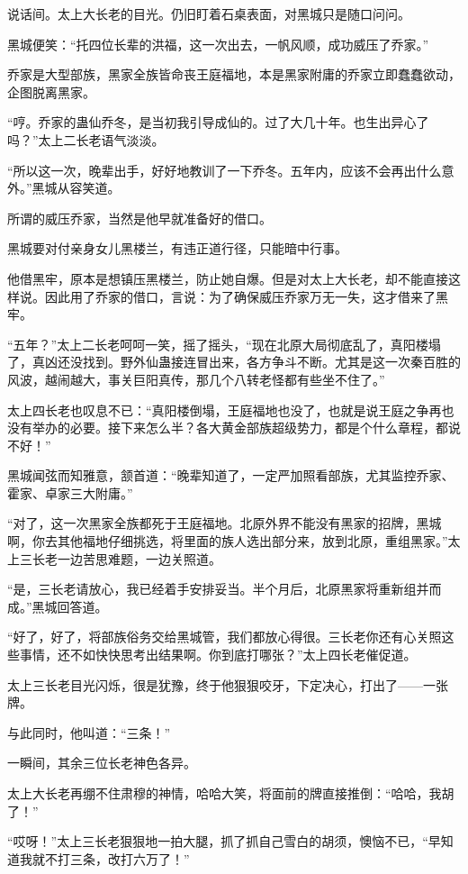 \begin{this_body}
说话间。太上大长老的目光。仍旧盯着石桌表面，对黑城只是随口问问。

黑城便笑：“托四位长辈的洪福，这一次出去，一帆风顺，成功威压了乔家。”

乔家是大型部族，黑家全族皆命丧王庭福地，本是黑家附庸的乔家立即蠢蠢欲动，企图脱离黑家。

“哼。乔家的蛊仙乔冬，是当初我引导成仙的。过了大几十年。也生出异心了吗？”太上二长老语气淡淡。

“所以这一次，晚辈出手，好好地教训了一下乔冬。五年内，应该不会再出什么意外。”黑城从容笑道。

所谓的威压乔家，当然是他早就准备好的借口。

黑城要对付亲身女儿黑楼兰，有违正道行径，只能暗中行事。

他借黑牢，原本是想镇压黑楼兰，防止她自爆。但是对太上大长老，却不能直接这样说。因此用了乔家的借口，言说：为了确保威压乔家万无一失，这才借来了黑牢。

“五年？”太上二长老呵呵一笑，摇了摇头，“现在北原大局彻底乱了，真阳楼塌了，真凶还没找到。野外仙蛊接连冒出来，各方争斗不断。尤其是这一次秦百胜的风波，越闹越大，事关巨阳真传，那几个八转老怪都有些坐不住了。”

太上四长老也叹息不已：“真阳楼倒塌，王庭福地也没了，也就是说王庭之争再也没有举办的必要。接下来怎么半？各大黄金部族超级势力，都是个什么章程，都说不好！”

黑城闻弦而知雅意，颔首道：“晚辈知道了，一定严加照看部族，尤其监控乔家、霍家、卓家三大附庸。”

“对了，这一次黑家全族都死于王庭福地。北原外界不能没有黑家的招牌，黑城啊，你去其他福地仔细挑选，将里面的族人选出部分来，放到北原，重组黑家。”太上三长老一边苦思难题，一边关照道。

“是，三长老请放心，我已经着手安排妥当。半个月后，北原黑家将重新组并而成。”黑城回答道。

“好了，好了，将部族俗务交给黑城管，我们都放心得很。三长老你还有心关照这些事情，还不如快快思考出结果啊。你到底打哪张？”太上四长老催促道。

太上三长老目光闪烁，很是犹豫，终于他狠狠咬牙，下定决心，打出了——一张牌。

与此同时，他叫道：“三条！”

一瞬间，其余三位长老神色各异。

太上大长老再绷不住肃穆的神情，哈哈大笑，将面前的牌直接推倒：“哈哈，我胡了！”

“哎呀！”太上三长老狠狠地一拍大腿，抓了抓自己雪白的胡须，懊恼不已，“早知道我就不打三条，改打六万了！”


\end{this_body}
